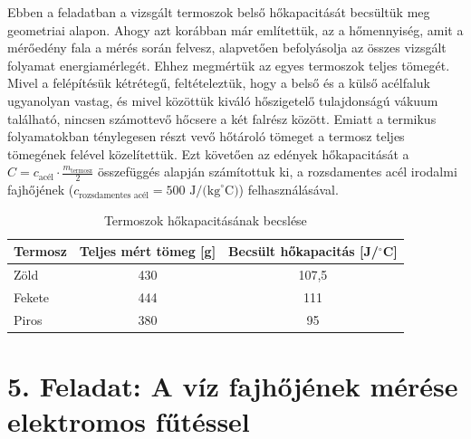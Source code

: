 \documentclass{article}
\begin{document}
Ebben a feladatban a vizsgált termoszok belső hőkapacitását becsültük meg geometriai alapon. Ahogy azt korábban már említettük, az a hőmennyiség, amit a mérőedény fala a mérés során felvesz, alapvetően befolyásolja az összes vizsgált folyamat energiamérlegét. Ehhez megmértük az egyes termoszok teljes tömegét. Mivel a felépítésük kétrétegű, feltételeztük, hogy a belső és a külső acélfaluk ugyanolyan vastag, és mivel közöttük kiváló hőszigetelő tulajdonságú vákuum található, nincsen számottevő hőcsere a két falrész között. Emiatt a termikus folyamatokban ténylegesen részt vevő hőtároló tömeget a termosz teljes tömegének felével közelítettük. Ezt követően az edények hőkapacitását a $C = c_{\text{acél}} \cdot \frac{m_{\text{termosz}}}{2}$ összefüggés alapján számítottuk ki, a rozsdamentes acél irodalmi fajhőjének ($c_{\text{rozsdamentes acél}} = 500 \text{ J/(kg}^{\circ}\text{C)}$) felhasználásával.

\begin{table}[H]
    \centering
    \begin{tabular}{|l|c|c|}
        \hline
        Termosz & Teljes mért tömeg [g] & Becsült hőkapacitás [J/$^{\circ}$C] \\\hline
        Zöld & 430 & 107,5 \\ \hline
        Fekete & 444 & 111 \\ \hline
        Piros & 380 & 95 \\ \hline
    \end{tabular}
    \caption{Termoszok hőkapacitásának becslése}
    \label{tab:hotan_4}
\end{table}

\section*{5. Feladat: A víz fajhőjének mérése elektromos fűtéssel}
\end{document}
